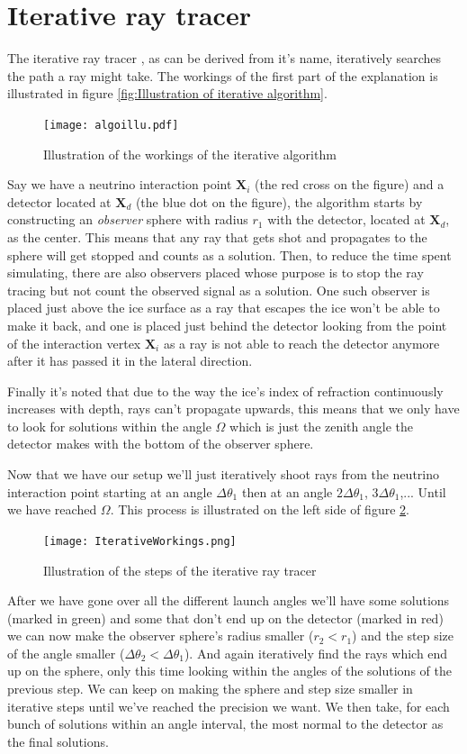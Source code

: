 \section{Iterative ray tracer}
\label{sec:Iterative}
The iterative ray tracer \cite{2022icrc.confE1027O}, as can be derived from
it's name, iteratively searches the path a ray might take. The workings of the
first part of the explanation is illustrated in figure \ref{fig:Illustration of
iterative algorithm}.  
\begin{figure}
  \centering
  \texttt{[image: algoillu.pdf]}
  \caption{Illustration of the workings of the iterative algorithm}
  \label{fig:Illustration of iterative algorithm}
\end{figure}
Say we have a neutrino interaction point $\mathbf{X}_i$
(the red cross on the figure) and a detector located at $\mathbf{X}_d$ (the
blue dot on the figure), the algorithm starts by constructing an
\textit{observer} sphere with radius $r_1$ with the detector, located at $\mathbf{X}_d$, as the
center.  This means that any ray that gets shot and propagates to the sphere
will get stopped and counts as a solution.  Then, to reduce the time spent simulating, there are also observers placed
whose purpose is to stop the ray tracing but not count the observed signal as a solution.
One such observer is placed 
just above the ice surface as a ray that escapes the ice won't be able to make it back, and one
is placed just behind the detector looking from the point of the interaction vertex $\mathbf{X}_i$ as
a ray is not able to reach the detector anymore after it has passed it in the
lateral direction. 

Finally it's noted that due to the way the ice's index of refraction
continuously increases with depth, rays can't propagate upwards, this means that we only 
have to look for solutions within the angle $\Omega$ which is just the zenith angle the detector
makes with the bottom of the observer sphere.

Now that we have our setup we'll just iteratively shoot rays from the neutrino
interaction point starting at an angle $\Delta \theta_1$ then at an angle
$2\Delta \theta_1$, $3\Delta \theta_1$,... Until we have reached $\Omega$. This
process is illustrated on the left side of figure \ref{fig:IterativeWorkings}.
\begin{figure}
  \centering
  \texttt{[image: IterativeWorkings.png]}
  \caption{Illustration of the steps of the iterative ray tracer}
  \label{fig:IterativeWorkings}
\end{figure}
After we have gone over all the different launch angles we'll have some
solutions (marked in green) and some that don't end up on the detector (marked
in red) we can now make the observer sphere's radius smaller ($r_2 < r_1$) and
the step size of the angle smaller ($\Delta \theta_2 < \Delta \theta_1$).  And
again iteratively find the rays which end up on the sphere, only this time
looking within the angles of the solutions of the previous step. We can keep on
making the sphere and step size smaller in iterative steps until we've reached
the precision we want. We then take, for each bunch of solutions within an
angle interval, the most normal to the detector as the final solutions.



